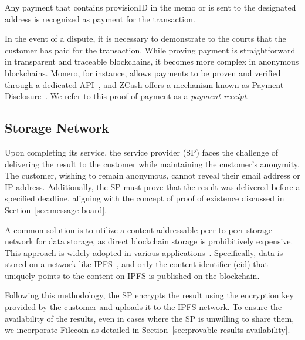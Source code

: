 \documentclass[pdftex,twocolumn,epjc3]{svjour3}
\begin{document}
Any payment that contains $\textrm{provisionID}$ in the memo or is sent to the designated address is recognized as payment for the transaction. 

\begin{sloppypar}
In the event of a dispute, it is necessary to demonstrate to the courts that the customer has paid for the transaction. While proving payment is straightforward in transparent and traceable blockchains, it becomes more complex in anonymous blockchains. Monero, for instance, allows payments to be proven and verified through a dedicated API~\cite{moneroHowProvePayment}, and ZCash offers a mechanism known as Payment Disclosure~\cite{daviesIntroductionPaymentDisclosure2017}. We refer to this proof of payment as a \textit{payment receipt}.
\end{sloppypar}

\subsection{Storage Network}\label{storage-network}

Upon completing its service, the service provider (SP) faces the challenge of delivering the result to the customer while maintaining the customer's anonymity. The customer, wishing to remain anonymous, cannot reveal their email address or IP address. Additionally, the SP must prove that the result was delivered before a specified deadline, aligning with the concept of proof of existence discussed in Section~\ref{sec:message-board}.

\begin{sloppypar}
A common solution is to utilize a content addressable peer-to-peer storage network for data storage, as direct blockchain storage is prohibitively expensive. This approach is widely adopted in various applications~\cite{shahidBlockchainBasedAgriFoodSupply2020, wangAuditableProtocolsFair2019, chenImprovedP2PFile2017}. Specifically, data is stored on a network like IPFS~\cite{benetIPFSContentAddressed2014}, and only the content identifier ($\mathrm{cid}$) that uniquely points to the content on IPFS is published on the blockchain.
\end{sloppypar}

Following this methodology, the SP encrypts the result using the encryption key provided by the customer and uploads it to the IPFS network. To ensure the availability of the results, even in cases where the SP is unwilling to share them, we incorporate Filecoin as detailed in Section~\ref{sec:provable-results-availability}.
\end{document}
